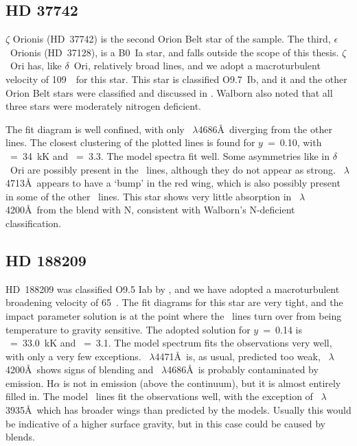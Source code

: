 \subsection{HD 37742}  %
\label{analysis:hd037742}
$\zeta$ Orionis (HD~37742) is the second Orion Belt star of the
sample. The third, $\epsilon$~Orionis (HD~37128), is a B0~Ia
star, and falls outside the scope of this thesis. $\zeta$~Ori has,
like $\delta$~Ori, relatively broad lines, and we adopt a
macroturbulent velocity of 109~\kms\ for this star. This star is
classified O9.7~Ib, and it and the other Orion Belt stars were
classified and discussed in . Walborn also noted that
all three stars were moderately nitrogen deficient.

The fit diagram is well confined, with only \heii~$\lambda$4686\AA\
diverging from the other lines. The closest clustering of the plotted
lines is found for $y$~=~0.10, with \teff~=~34~kK and \logg~=~3.3. The
model spectra fit well. Some asymmetries like in $\delta$~Ori are 
possibly present in the \hi\ lines, although they do not appear as
strong. \hei~$\lambda$4713\AA\ appears to have a `bump' in the red
wing, which is also possibly present in some of the other \hei\
lines. This star shows very little absorption in
\heii~$\lambda$4200\AA\ from the blend with N\scr{3}, consistent
with Walborn's N-deficient classification.


\subsection{HD 188209}  %
\label{analysis:hd188209}

HD~188209 was classified O9.5 Iab by , and we have
adopted a macroturbulent broadening velocity of 65~\kms. The fit diagrams
for this star are very tight, and the impact parameter solution is at
the point where the \heii\ lines turn over from being temperature to
gravity sensitive. The adopted solution for $y$~=~0.14 is
\teff~=~33.0~kK and \logg~=~3.1. The model spectrum fits the
observations very well, with only a very few
exceptions. \hei~$\lambda$4471\AA\ is, as usual, predicted too weak,
\heii~$\lambda$4200\AA\ shows signs of blending and
\heii~$\lambda$4686\AA\ is probably contaminated by
emission. H$\alpha$ is not in emission (above the continuum), but it
is almost entirely filled in. The model \hi\ lines fit the
observations well, with the exception of \hi~$\lambda$3935\AA\ which
has broader wings than predicted by the models. Usually this would be
indicative of a higher surface gravity, but in this case could be
caused by blends.

